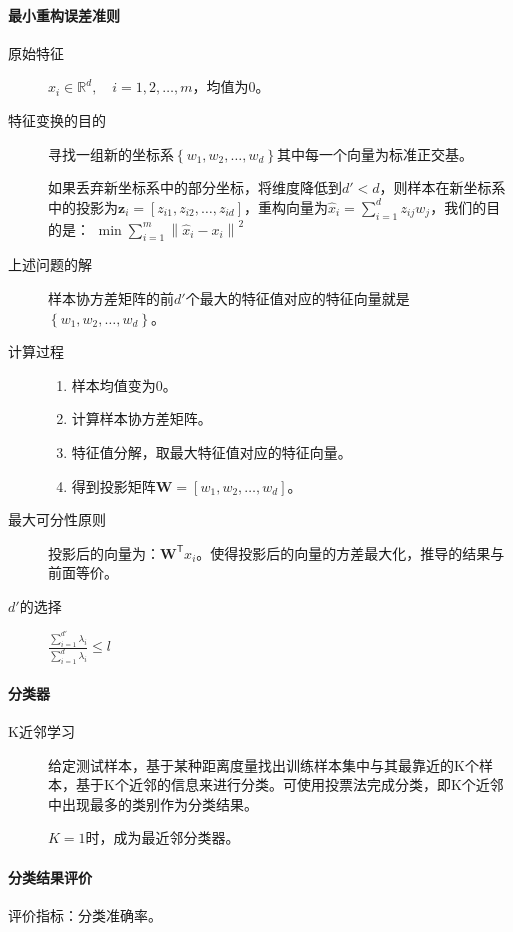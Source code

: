 \paragraph{最小重构误差准则}
\begin{description}
	\item[原始特征] $x_i\in \mathbb{R}^d,\quad i=1,2,\dots ,m$，均值为$0$。
	\item[特征变换的目的] 寻找一组新的坐标系$\left\lbrace w_1, w_2,\dots, w_d \right\rbrace$其中每一个向量为标准正交基。
	
	如果丢弃新坐标系中的部分坐标，将维度降低到$d'<d$，则样本在新坐标系中的投影为$\mathbf{z}_i=\left[ z_{i1}, z_{i2},\dots, z_{id} \right]$，重构向量为$\hat{x}_i=\sum_{i=1}^{d}z_{ij}w_j$，我们的目的是：
	$ \min\sum_{i=1}^{m}\left\| \hat{x}_i-x_i \right\|^2 $
	\item[上述问题的解] 样本协方差矩阵的前$d'$个最大的特征值对应的特征向量就是$\left\lbrace w_1, w_2,\dots,w_d \right\rbrace$。
	\item[计算过程]
	\begin{enumerate}
		\item 样本均值变为$0$。
		\item 计算样本协方差矩阵。
		\item 特征值分解，取最大特征值对应的特征向量。
		\item 得到投影矩阵$\mathbf{W}=\left[ w_1, w_2,\dots, w_d \right]$。
	\end{enumerate}
	\item[最大可分性原则] 投影后的向量为：$\mathbf{W}^\mathsf{T}x_i$。使得投影后的向量的方差最大化，推导的结果与前面等价。
	\item[$d'$的选择] $\frac{\sum_{i=1}^{d'}\lambda_i}{\sum_{i=1}^{d}\lambda_i}\leq l$
\end{description}
\paragraph{分类器}
\begin{description}
	\item[K近邻学习] 给定测试样本，基于某种距离度量找出训练样本集中与其最靠近的K个样本，基于K个近邻的信息来进行分类。可使用投票法完成分类，即K个近邻中出现最多的类别作为分类结果。
	
	$K=1$时，成为最近邻分类器。
\end{description}
\paragraph{分类结果评价}
评价指标：分类准确率。
